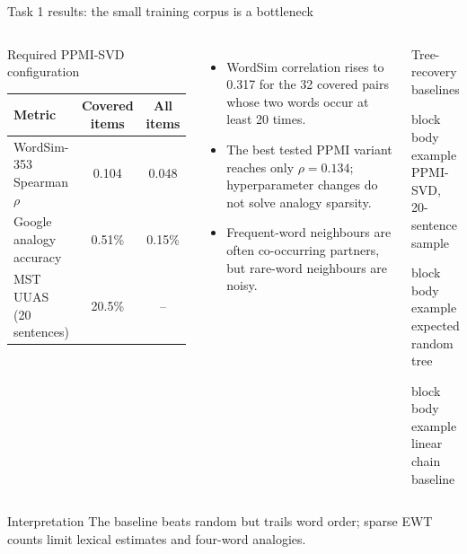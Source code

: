 \documentclass[aspectratio=169,9pt]{beamer}
\newcommand{\metric}[2]{\begin{beamercolorbox}[rounded=true,sep=0.65ex,wd=\linewidth]{block body example}\centering{\Large\bfseries\color{Teal}#1}\\[-0.2ex]{\scriptsize\color{Muted}#2}\end{beamercolorbox}}
\newcommand{\tightitem}{\setlength{\itemsep}{0.14em}\setlength{\parskip}{0pt}}
\begin{document}
\begin{frame}{Task 1 results: the small training corpus is a bottleneck}
\vspace{-0.1em}
\begin{columns}[T,onlytextwidth]
  \begin{block}{Required PPMI-SVD configuration}
    \centering
    \small
    \begin{tabular}{lcc}
      \toprule
      \textbf{Metric} & \textbf{Covered items} & \textbf{All items}\\
      \midrule
      WordSim-353 Spearman $\rho$ & 0.104 & 0.048\\
      Google analogy accuracy & 0.51\% & 0.15\%\\
      MST UUAS (20 sentences) & 20.5\% & --\\
      \bottomrule
    \end{tabular}
  \end{block}
  \begin{itemize}\tightitem
    \item WordSim correlation rises to 0.317 for the 32 covered pairs whose two words occur at least 20 times.
    \item The best tested PPMI variant reaches only $\rho=0.134$; hyperparameter changes do not solve analogy sparsity.
    \item Frequent-word neighbours are often co-occurring partners, but rare-word neighbours are noisy.
  \end{itemize}
  \begin{block}{Tree-recovery baselines}
    \metric{20.5\%}{PPMI-SVD, 20-sentence sample}
    \vspace{0.1em}
    \metric{15.2\%}{expected random tree}
    \vspace{0.1em}
    \metric{43.2\%}{linear chain baseline}
  \end{block}
\end{columns}
\begin{alertblock}{Interpretation}
The baseline beats random but trails word order; sparse EWT counts limit lexical estimates and four-word analogies.
\end{alertblock}
\end{frame}
\end{document}
